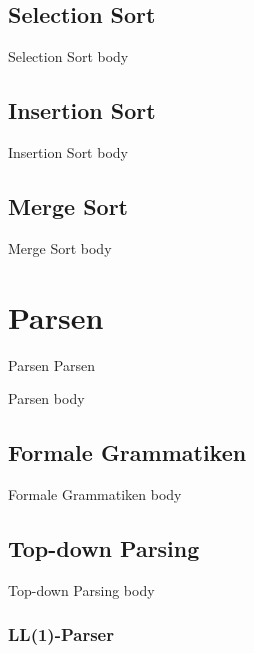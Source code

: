 \documentclass[18pt]{beamer}
\begin{document}
\subsection{Selection Sort}

\begin{frame}{Selection Sort}
    body
\end{frame}

\subsection{Insertion Sort}

\begin{frame}{Insertion Sort}
    body
\end{frame}

\subsection{Merge Sort}

\begin{frame}{Merge Sort}
    body
\end{frame}

\section{Parsen}

\begin{frame}{Parsen}
    \center
    \Huge{Parsen}
\end{frame}

\begin{frame}{Parsen}
    body
\end{frame}

\subsection{Formale Grammatiken}

\begin{frame}{Formale Grammatiken}
    body
\end{frame}

\subsection{Top-down Parsing}

\begin{frame}{Top-down Parsing}
    body
\end{frame}

\subsubsection{LL(1)-Parser}
\end{document}
